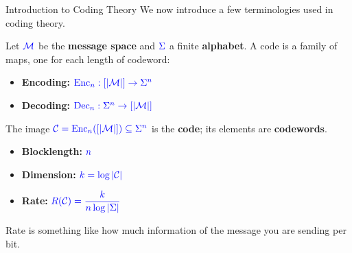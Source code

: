 \documentclass[10pt,handout]{beamer}
\begin{document}
\begin{frame}{Introduction to Coding Theory}
	We now introduce a few terminologies used in coding theory.
	\vspace{0.5em}\pause

	Let $\textcolor{blue}{\textcolor{blue}{\mathcal{M}}}$ be the \textbf{message space} and $\textcolor{blue}{\textcolor{blue}{\Sigma}}$ a finite \textbf{alphabet}. A code is a family of maps, one for each length of codeword:\pause
	\begin{itemize}
		\item \textbf{Encoding:} $\textcolor{blue}{\textcolor{blue}{\mathrm{Enc}_n : [|\mathcal{M}|] \to \Sigma^n}}$\pause
		\item \textbf{Decoding:} $\textcolor{blue}{\textcolor{blue}{\mathrm{Dec}_n : \Sigma^n \to [|\mathcal{M}|]}}$
	\end{itemize}\pause

	The image $\textcolor{blue}{\textcolor{blue}{\mathcal{C} = \mathrm{Enc}_n([|\mathcal{M}|]) \subseteq \Sigma^n}}$ is the \textbf{code}; its elements are \textbf{codewords}.\pause

	\begin{itemize}
		\item \textbf{Blocklength:} $\textcolor{blue}{\textcolor{blue}{n}}$\pause
		\item \textbf{Dimension:} $\textcolor{blue}{\textcolor{blue}{k = \log|\mathcal{C}|}}$\pause
		\item \textbf{Rate:} $\textcolor{blue}{\textcolor{blue}{R(\mathcal{C}) = \dfrac{k}{n\log|\Sigma|}}}$
	\end{itemize}

	Rate is something like how much information of the message you are sending per bit.
\end{frame}
\end{document}
